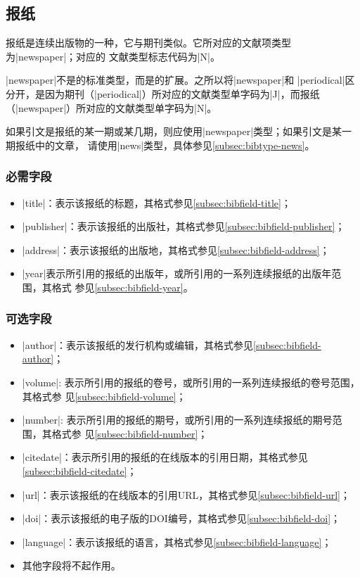 \subsection{报纸}\label{subsec:bibtype-newspaper}

报纸是连续出版物的一种，它与期刊类似。它所对应的{\BibTeX}文献项类型为|newspaper|；对应的
文献类型标志代码为|N|\cite{gbt3469-1983}。

|newspaper|不是{\BibTeX}的标准类型，而是{\njuthesis}的扩展。之所以将|newspaper|和
|periodical|区分开，是因为期刊（|periodical|）所对应的文献类型单字码为|J|，而报纸
（|newspaper|）所对应的文献类型单字码为|N|\cite{gbt3469-1983}。

\begin{note}
如果引文是报纸的某一期或某几期，则应使用|newspaper|类型；如果引文是某一期报纸中的文章，
请使用|news|类型，具体参见\ref{subsec:bibtype-news}。
\end{note}

\subsubsection{必需字段}

\begin{itemize}
\item |title|：表示该报纸的标题，其格式参见\ref{subsec:bibfield-title}；
\item |publisher|：表示该报纸的出版社，其格式参见\ref{subsec:bibfield-publisher}；
\item |address|：表示该报纸的出版地，其格式参见\ref{subsec:bibfield-address}；
\item |year|表示所引用的报纸的出版年，或所引用的一系列连续报纸的出版年范围，其格式
  参见\ref{subsec:bibfield-year}。
\end{itemize}

\subsubsection{可选字段}

\begin{itemize}
\item |author|：表示该报纸的发行机构或编辑，其格式参见\ref{subsec:bibfield-author}；
\item |volume|: 表示所引用的报纸的卷号，或所引用的一系列连续报纸的卷号范围，其格式参
  见\ref{subsec:bibfield-volume}；
\item |number|: 表示所引用的报纸的期号，或所引用的一系列连续报纸的期号范围，其格式参
  见\ref{subsec:bibfield-number}；
\item |citedate|：表示所引用的报纸的在线版本的引用日期，其格式参见\ref{subsec:bibfield-citedate}；
\item |url|：表示该报纸的在线版本的引用URL，其格式参见\ref{subsec:bibfield-url}；
\item |doi|：表示该报纸的电子版的DOI编号，其格式参见\ref{subsec:bibfield-doi}；
\item |language|：表示该报纸的语言，其格式参见\ref{subsec:bibfield-language}；
\item 其他字段将不起作用。
\end{itemize}

